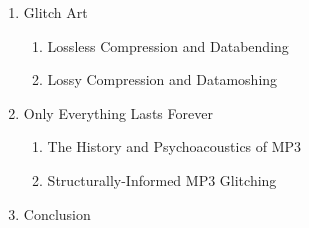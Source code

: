 \documentclass{article}
\begin{document}
\begin{enumerate}
	\item Glitch Art
	\begin{enumerate}
		\item Lossless Compression and Databending
			\cite{indianropeburn_databenders_????}\cite{liminalmike_flickr:glitch_????}\cite{cory_arcangel_photoshop_2009}
			\cite{media_art_net_media_2010}
		\item Lossy Compression and Datamoshing
			\cite{!mediengruppe_bitnik_and_sven_knig_download_????}\cite{evan_meaney_ceibas:_2008}\cite{imbecil_mpeg_2004}
			\cite{john_michael_boling_rhizome_????}\cite{nikolai_trunichkin_and_dr._dmitriy_vatolin_crazy_????}
			\cite{ramachandran_phantoms_1999}
	\end{enumerate}
	
	\item Only Everything Lasts Forever
		\begin{enumerate}
		\item The History and Psychoacoustics of MP3
			\cite{Ruckert05}
		\item Structurally-Informed MP3 Glitching
	\end{enumerate}
	
	\item Conclusion
\end{enumerate}



\end{document}
